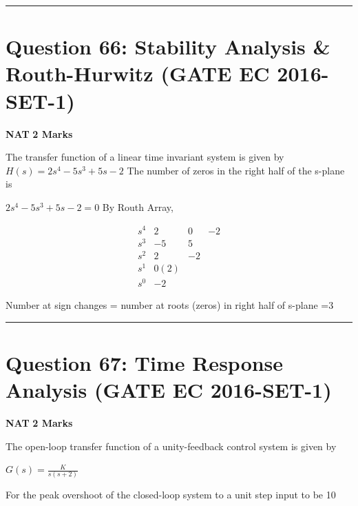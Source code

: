 \documentclass[11pt,a4paper]{article}
\begin{document}
\vspace{1.5em}
\hrule
\vspace{1.5em}

\section*{Question 66: Stability Analysis \& Routh-Hurwitz (GATE EC 2016-SET-1)}
\noindent \textbf{\color{primary}NAT} \hfill \textbf{\color{secondary}2 Marks}


\noindent The transfer function of a linear time invariant system is given by  
$H(s)=2s^{4}-5s^{3}+5s-2$ 
 The number of zeros in the right half of the s-plane is \underline{\hspace{1.5cm}}


\begin{tcolorbox}[solbox, title=Detailed Solution -- Question 66]
$2 s^{4}-5 s^{3}+5 s-2=0$
 By Routh Array, 

\[
\begin{array}{c|ccc} s^{4} & 2 & 0 & -2 \\ s^{3} & -5 & 5 & \\ s^{2} & 2 & -2 & \\ s^{1} & 0(2) & & \\ s^{0} & -2 & & \end{array}
\]

 Number at sign changes = number at roots (zeros)  in right half of s-plane =3
\end{tcolorbox}

\vspace{1.5em}
\hrule
\vspace{1.5em}

\section*{Question 67: Time Response Analysis (GATE EC 2016-SET-1)}
\noindent \textbf{\color{primary}NAT} \hfill \textbf{\color{secondary}2 Marks}


\noindent The open-loop transfer function of a unity-feedback control system is given by 
 
$G(s)=\frac{K}{s(s+2)}$
 
 For the peak overshoot of the closed-loop system to a unit step input to be 10%
\end{document}
